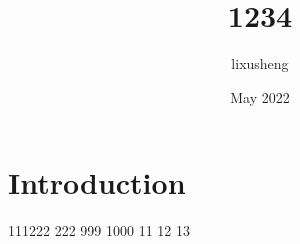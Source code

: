 \documentclass{article}
\title{1234}
\author{lixusheng }
\date{May 2022}
\begin{document}
\maketitle

\section{Introduction}
111222
222
999
1000
11
12
13
\end{document}
